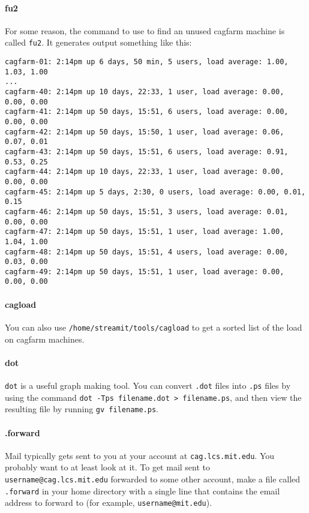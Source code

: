 \paragraph{fu2}
For some reason, the command to use to find an unused cagfarm machine
is called {\tt fu2}. It generates output something like this:
\begin{verbatim}
cagfarm-01: 2:14pm up 6 days, 50 min, 5 users, load average: 1.00, 1.03, 1.00
...
cagfarm-40: 2:14pm up 10 days, 22:33, 1 user, load average: 0.00, 0.00, 0.00
cagfarm-41: 2:14pm up 50 days, 15:51, 6 users, load average: 0.00, 0.00, 0.00
cagfarm-42: 2:14pm up 50 days, 15:50, 1 user, load average: 0.06, 0.07, 0.01
cagfarm-43: 2:14pm up 50 days, 15:51, 6 users, load average: 0.91, 0.53, 0.25
cagfarm-44: 2:14pm up 10 days, 22:33, 1 user, load average: 0.00, 0.00, 0.00
cagfarm-45: 2:14pm up 5 days, 2:30, 0 users, load average: 0.00, 0.01, 0.15
cagfarm-46: 2:14pm up 50 days, 15:51, 3 users, load average: 0.01, 0.00, 0.00
cagfarm-47: 2:14pm up 50 days, 15:51, 1 user, load average: 1.00, 1.04, 1.00
cagfarm-48: 2:14pm up 50 days, 15:51, 4 users, load average: 0.00, 0.03, 0.00
cagfarm-49: 2:14pm up 50 days, 15:51, 1 user, load average: 0.00, 0.00, 0.00
\end{verbatim}

\paragraph{cagload}

You can also use {\tt /home/streamit/tools/cagload} to get a sorted
list of the load on cagfarm machines.

\paragraph{dot}
\label{sec:dot}
{\tt dot} is a useful graph making tool. You can convert {\tt .dot}
files into {\tt .ps} files by using the command {\tt dot -Tps
  filename.dot > filename.ps}, and then view the resulting file by
running {\tt gv filename.ps}.

\paragraph{.forward}
Mail typically gets sent to you at your account at {\tt cag.lcs.mit.edu}. 
You probably want to
at least look at it. To get mail sent to {\tt username@cag.lcs.mit.edu}
forwarded to some other account, make a file called {\tt .forward}
in your home directory with a single line that contains the email address
to forward to (for example, {\tt username@mit.edu}).

